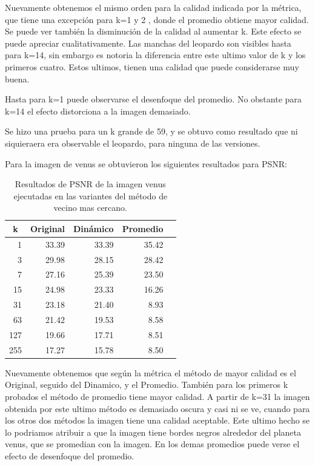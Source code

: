 \documentclass[a4paper]{article}
\newcounter{col}
\begin{document}
Nuevamente obtenemos el mismo orden para la calidad indicada por la métrica, que tiene una excepción para k=1 y 2 , donde el promedio obtiene mayor calidad.  Se puede ver también la disminución de la calidad al aumentar k. Este efecto se puede apreciar cualitativamente. Las manchas del leopardo son visibles hasta para k=14, sin embargo es notoria la diferencia entre este ultimo valor de k y los primeros cuatro. Estos ultimos, tienen una calidad que puede considerarse muy buena.

Hasta para k=1 puede observarse el desenfoque del promedio. No obstante para k=14 el efecto distorciona a la imagen demasiado.

Se hizo una  prueba para un k grande de 59, y se obtuvo como resultado que ni siquieraera era observable el leopardo, para ninguna de las versiones.


Para la imagen de venus se obtuvieron los siguientes resultados para PSNR:


\begin{table}[H]
\centering
\begin{tabular}{|r|r|r|r|r|}
\hline
\multicolumn{1}{|c|}{k} & \multicolumn{1}{c|}{Original} & \multicolumn{1}{c|}{Dinámico} & \multicolumn{1}{c|}{Promedio} \\ \hline
1 & 33.39 & 33.39& 35.42 \\ \hline
3 & 29.98 &  28.15 & 28.42 \\ \hline
7 & 27.16 &  25.39 &  23.50 \\ \hline
15 &24.98&  23.33 &  16.26 \\ \hline
31 & 23.18 & 21.40&  8.93 \\ \hline
63 & 21.42 &   19.53 & 8.58 \\ \hline
127 & 19.66 &  17.71 &  8.51 \\ \hline
255 &17.27&  15.78 & 8.50 \\ \hline
\end{tabular}
\caption{Resultados de PSNR de la imagen venus ejecutadas en las variantes del m\'etodo de vecino mas cercano.}
\label{}
\end{table}


Nuevamente obtenemos que según la métrica el método de mayor calidad es el Original, seguido del Dinamico, y el Promedio. También para los primeros k probados el método de promedio tiene mayor calidad. A partir de k=31 la imagen obtenida por este ultimo método es demasiado oscura y casi ni se ve, cuando para los otros dos métodos la imagen tiene una calidad aceptable. Este ultimo hecho se lo podriamos atribuir a que la imagen tiene bordes negros alrededor del planeta venus, que se promedian con la imagen. En los demas promedios puede verse el efecto de desenfoque del promedio.
\end{document}
